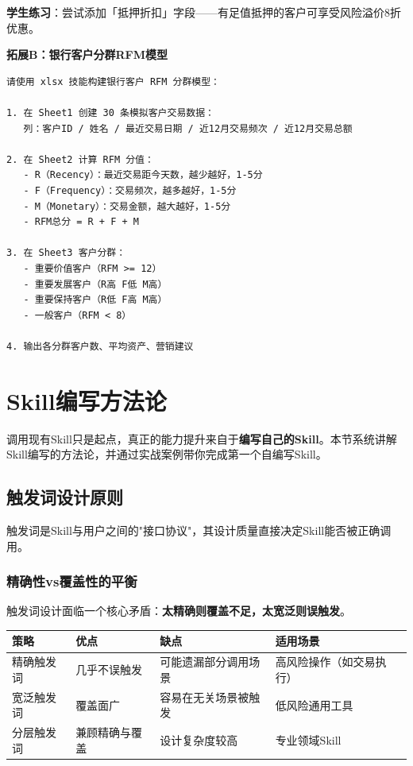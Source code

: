 \textbf{学生练习}：尝试添加「抵押折扣」字段——有足值抵押的客户可享受风险溢价8折优惠。

\textbf{拓展B：银行客户分群RFM模型}

\begin{lstlisting}
请使用 xlsx 技能构建银行客户 RFM 分群模型：

1. 在 Sheet1 创建 30 条模拟客户交易数据：
   列：客户ID / 姓名 / 最近交易日期 / 近12月交易频次 / 近12月交易总额

2. 在 Sheet2 计算 RFM 分值：
   - R（Recency）：最近交易距今天数，越少越好，1-5分
   - F（Frequency）：交易频次，越多越好，1-5分
   - M（Monetary）：交易金额，越大越好，1-5分
   - RFM总分 = R + F + M

3. 在 Sheet3 客户分群：
   - 重要价值客户（RFM >= 12）
   - 重要发展客户（R高 F低 M高）
   - 重要保持客户（R低 F高 M高）
   - 一般客户（RFM < 8）

4. 输出各分群客户数、平均资产、营销建议
\end{lstlisting}

\section{Skill编写方法论}

调用现有Skill只是起点，真正的能力提升来自于\textbf{编写自己的Skill}。本节系统讲解Skill编写的方法论，并通过实战案例带你完成第一个自编写Skill。

\subsection{触发词设计原则}

触发词是Skill与用户之间的"接口协议"，其设计质量直接决定Skill能否被正确调用。

\subsubsection{精确性vs覆盖性的平衡}

触发词设计面临一个核心矛盾：\textbf{太精确则覆盖不足，太宽泛则误触发}。

\begin{table}[H]
\centering
\begin{tabular}{lp{4cm}p{4cm}p{3cm}}
\toprule
\textbf{策略} & \textbf{优点} & \textbf{缺点} & \textbf{适用场景} \\
\midrule
精确触发词 & 几乎不误触发 & 可能遗漏部分调用场景 & 高风险操作（如交易执行） \\
宽泛触发词 & 覆盖面广 & 容易在无关场景被触发 & 低风险通用工具 \\
分层触发词 & 兼顾精确与覆盖 & 设计复杂度较高 & 专业领域Skill \\
\bottomrule
\end{tabular}
\end{table}


